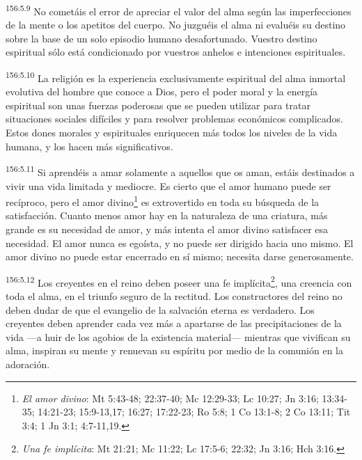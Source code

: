 \par
\textsuperscript{156:5.9} No cometáis el error de apreciar el valor del alma según las imperfecciones de la mente o los apetitos del cuerpo. No juzguéis el alma ni evaluéis su destino sobre la base de un solo episodio humano desafortunado. Vuestro destino espiritual sólo está condicionado por vuestros anhelos e intenciones espirituales.

\par
\textsuperscript{156:5.10} La religión es la experiencia exclusivamente espiritual del alma inmortal evolutiva del hombre que conoce a Dios, pero el poder moral y la energía espiritual son unas fuerzas poderosas que se pueden utilizar para tratar situaciones sociales difíciles y para resolver problemas económicos complicados. Estos dones morales y espirituales enriquecen más todos los niveles de la vida humana, y los hacen más significativos.

\par
\textsuperscript{156:5.11} Si aprendéis a amar solamente a aquellos que os aman, estáis destinados a vivir una vida limitada y mediocre. Es cierto que el amor humano puede ser recíproco, pero el amor divino\footnote{\textit{El amor divino}: Mt 5:43-48; 22:37-40; Mc 12:29-33; Lc 10:27; Jn 3:16; 13:34-35; 14:21-23; 15:9-13,17; 16:27; 17:22-23; Ro 5:8; 1 Co 13:1-8; 2 Co 13:11; Tit 3:4; 1 Jn 3:1; 4:7-11,19.} es extrovertido en toda su búsqueda de la satisfacción. Cuanto menos amor hay en la naturaleza de una criatura, más grande es su necesidad de amor, y más intenta el amor divino satisfacer esa necesidad. El amor nunca es egoísta, y no puede ser dirigido hacia uno mismo. El amor divino no puede estar encerrado en sí mismo; necesita darse generosamente.

\par
\textsuperscript{156:5.12} Los creyentes en el reino deben poseer una fe implícita\footnote{\textit{Una fe implícita}: Mt 21:21; Mc 11:22; Lc 17:5-6; 22:32; Jn 3:16; Hch 3:16.}, una creencia con toda el alma, en el triunfo seguro de la rectitud. Los constructores del reino no deben dudar de que el evangelio de la salvación eterna es verdadero. Los creyentes deben aprender cada vez más a apartarse de las precipitaciones de la vida ---a huir de los agobios de la existencia material--- mientras que vivifican su alma, inspiran su mente y renuevan su espíritu por medio de la comunión en la adoración.

